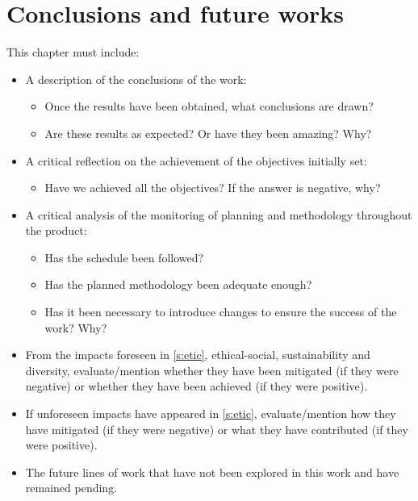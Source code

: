\documentclass[ENG,BIB]{TFUOC}%
\begin{document}
\chapter{Conclusions and future works}

This chapter must include:
\begin{itemize}
\item A description of the conclusions of the work:
\begin{itemize}
    \item Once the results have been obtained, what conclusions are drawn?
    \item Are these results as expected? Or have they been amazing? Why?
\end{itemize}
\item A critical reflection on the achievement of the objectives initially set:
\begin{itemize}
    \item Have we achieved all the objectives? If the answer is negative, why?
\end{itemize}
\item A critical analysis of the monitoring of planning and methodology throughout the product:
\begin{itemize}
    \item Has the schedule been followed?
    \item Has the planned methodology been adequate enough?
    \item Has it been necessary to introduce changes to ensure the success of the work? Why?
\end{itemize}
\item From the impacts foreseen in \ref{s:etic}, ethical-social, sustainability and diversity, evaluate/mention whether they have been mitigated (if they were negative) or whether they have been achieved (if they were positive). 
\item If unforeseen impacts have appeared in \ref{s:etic}, evaluate/mention how they have mitigated (if they were negative) or what they have contributed (if they were positive).
\item The future lines of work that have not been explored in this work and have remained pending.


\end{itemize}
\end{document}
